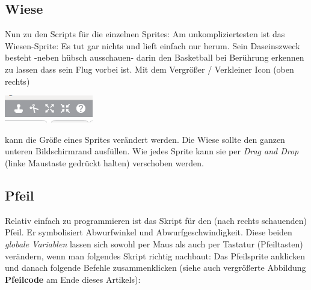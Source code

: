 \subsection*{Wiese}

Nun zu den Scripts für die einzelnen Sprites: Am unkompliziertesten ist das Wiesen-Sprite: Es tut gar nichts und lieft einfach nur herum. Sein Daseinszweck besteht -neben hübsch ausschauen- darin den Basketball bei Berührung erkennen zu lassen dass sein Flug vorbei ist. Mit dem Vergrößer / Verkleiner Icon (oben rechts) 

\begin{center}
\includegraphics[width=\linewidth]{scratch/fschrumpfer.png}
\end{center}

kann die Größe eines Sprites verändert werden. Die Wiese sollte den ganzen unteren Bildschirmrand ausfüllen. Wie jedes Sprite kann sie per \textit{Drag and Drop} (linke Maustaste gedrückt halten) verschoben werden.

\subsection*{Pfeil}

Relativ einfach zu programmieren ist das Skript für den (nach rechts schauenden) Pfeil. Er symbolisiert Abwurfwinkel und Abwurfgeschwindigkeit. Diese beiden \textit{globale Variablen} lassen sich sowohl per Maus als auch per Tastatur (Pfeiltasten) verändern, wenn man folgendes Skript richtig nachbaut: Das Pfeilsprite anklicken und danach folgende Befehle zusammenklicken (siehe auch vergrößerte Abbildung \textbf{Pfeilcode} am Ende dieses Artikels):

